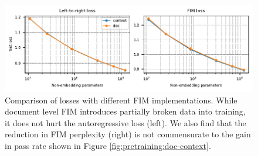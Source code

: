 \begin{figure}[ht!]
\centering
\includegraphics[width=\textwidth]{figures/doc-chunk-code-loss.pdf}
\caption{
Comparison of losses with different FIM implementations. While document level FIM introduces partially broken data into training, it does not hurt the autoregressive loss (left). We also find that the reduction in FIM perplexity (right) is not commensurate to the gain in pass rate shown in Figure \ref{fig:pretraining:doc-context}.
}
\label{fig:pretraining:doc-context-loss}
\end{figure}

